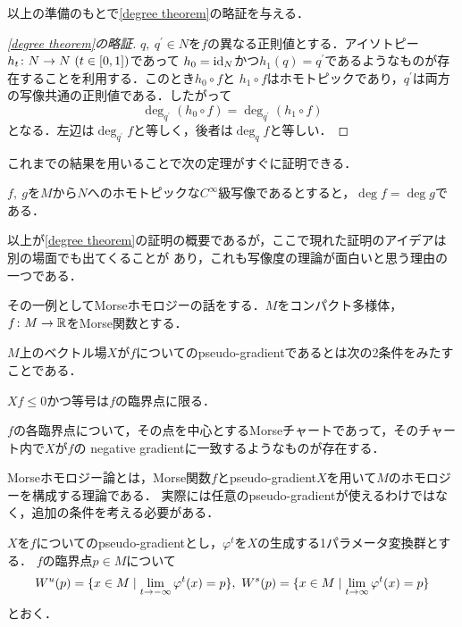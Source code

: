 \documentclass[dvipdfmx,uplatex]{jsarticle}
\begin{document}
以上の準備のもとで\cref{degree theorem}の略証を与える．

\begin{proof}[\cref{degree theorem}の略証]
$q,\ q^\prime\in N$を$f$の異なる正則値とする．アイソトピー$h_t\colon N\to N\ (t\in[0,1])$であって
$h_0=\mathrm{id}_N $かつ$h_1(q)=q^\prime$であるようなものが存在することを利用する．このとき$h_0\circ f$と
$h_1\circ f$はホモトピックであり，$q^\prime$は両方の写像共通の正則値である．したがって
\[ \deg_{q^\prime} (h_0 \circ f) = \deg_{q^\prime} (h_1\circ f) \]
となる．左辺は$\deg_{q^\prime} f$と等しく，後者は$\deg_q f$と等しい．
\end{proof}

これまでの結果を用いることで次の定理がすぐに証明できる．

\begin{theorem}
$f,\ g$を$M$から$N$へのホモトピックな$C^\infty$級写像であるとすると，$\deg f = \deg g$である．
\end{theorem}

以上が\cref{degree theorem}の証明の概要であるが，ここで現れた証明のアイデアは別の場面でも出てくることが
あり，これも写像度の理論が面白いと思う理由の一つである．

その一例としてMorseホモロジーの話をする．$M$をコンパクト多様体，$f\colon M\to\mathbb{R}$をMorse関数とする．

\begin{definition}
$M$上のベクトル場$X$が$f$についてのpseudo-gradientであるとは次の2条件をみたすことである．
\begin{enumarabicp}
\item $Xf \leq 0$かつ等号は$f$の臨界点に限る．
\item $f$の各臨界点について，その点を中心とするMorseチャートであって，そのチャート内で$X$が$f$の
negative gradientに一致するようなものが存在する．
\end{enumarabicp}
\end{definition}

Morseホモロジー論とは，Morse関数$f$とpseudo-gradient$X$を用いて$M$のホモロジーを構成する理論である．
実際には任意のpseudo-gradientが使えるわけではなく，追加の条件を考える必要がある．

\begin{definition}
$X$を$f$についてのpseudo-gradientとし，$\varphi^t$を$X$の生成する1パラメータ変換群とする．
$f$の臨界点$p\in M$について
\[
    W^u(p)=\{x\in M\mid\lim _{t\to -\infty}\varphi^t(x)=p\mbox{}\},\ W^s(p)=\{x\in M\mid\lim _{t\to \infty}\varphi^t(x)=p\mbox{}\}
\]
とおく．
\end{definition}
\end{document}
